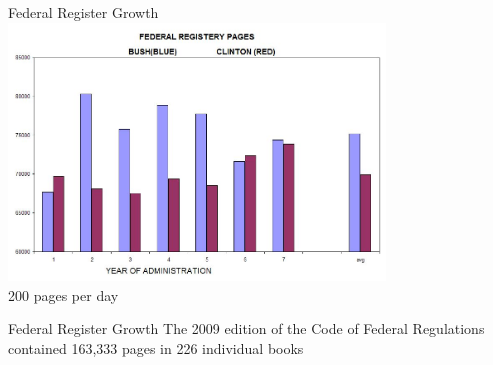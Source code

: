 %
%
%            

\begin{frame}{Federal Register Growth}
    \centering
    \includegraphics[width=0.75\textwidth]{img/fed-reg-graph.png} \\
    { \large 200 pages per day \\}
\end{frame}

\begin{frame}{Federal Register Growth}
    The 2009 edition of the Code of Federal Regulations contained 163,333 pages in 226 individual books
\end{frame}

